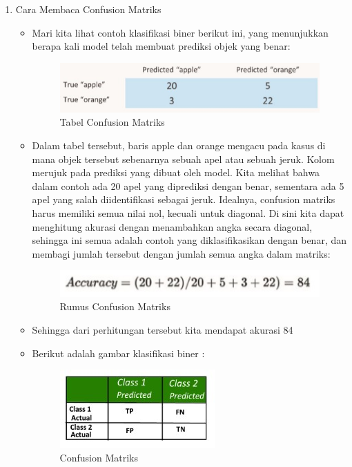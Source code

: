 \begin{enumerate}
\item Cara Membaca Confusion Matriks
	\begin{itemize}
		\item Mari kita lihat contoh klasifikasi biner berikut ini, yang menunjukkan berapa kali model telah membuat prediksi objek yang benar:
			\begin{figure}[!hbtp]
			\centering
			\includegraphics[scale=0.5]{figures/j2a.jpg}
			\caption{Tabel Confusion Matriks}
			\label{contoh}
			\end{figure}
		\item Dalam tabel tersebut, baris apple dan orange mengacu pada kasus di mana objek tersebut sebenarnya sebuah apel atau sebuah jeruk. Kolom merujuk pada prediksi yang dibuat oleh model. Kita melihat bahwa dalam contoh ada 20 apel yang diprediksi dengan benar, sementara ada 5 apel yang salah diidentifikasi sebagai jeruk. Idealnya, confusion matriks harus memiliki semua nilai nol, kecuali untuk diagonal. Di sini kita dapat menghitung akurasi dengan menambahkan angka secara diagonal, sehingga ini semua adalah contoh yang diklasifikasikan dengan benar, dan membagi jumlah tersebut dengan jumlah semua angka dalam matriks:
			\begin{figure}[!hbtp]
			\centering
			\includegraphics[scale=0.5]{figures/j2b.jpg}
			\caption{Rumus Confusion Matriks}
			\label{contoh}
			\end{figure}
		\item Sehingga dari perhitungan tersebut kita mendapat akurasi 84%
		\item Berikut adalah gambar klasifikasi biner :
			\begin{figure}[!hbtp]
			\centering
			\includegraphics[scale=0.5]{figures/j2c.jpg}
			\caption{Confusion Matriks}
			\label{contoh}
			\end{figure}
	\end{itemize}
	

\end{enumerate}
